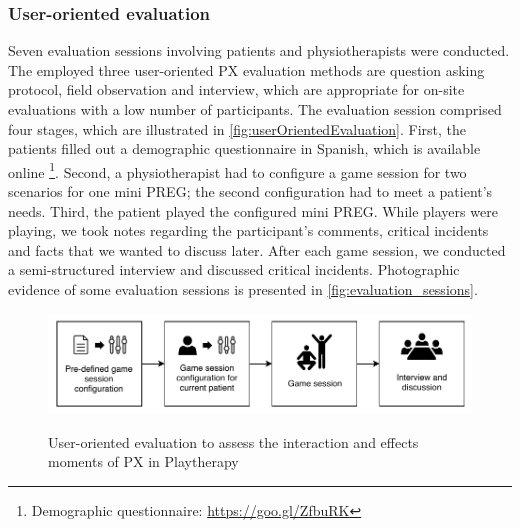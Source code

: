 \subsubsection{User-oriented evaluation}
Seven evaluation sessions involving patients and physiotherapists were conducted. The employed three user-oriented \ac{PX} evaluation methods are question asking protocol, field observation and interview, which are appropriate for on-site evaluations with a low number of participants. The evaluation session comprised four stages, which are illustrated in \autoref{fig:userOrientedEvaluation}. First, the patients filled out a demographic questionnaire in Spanish, which is available online \footnote{Demographic questionnaire: \url{https://goo.gl/ZfbuRK}}. Second, a physiotherapist had to configure a game session for two scenarios for one mini \ac{PREG}; the second configuration had to meet a patient's needs. Third, the patient played the configured mini \ac{PREG}. While players were playing, we took notes regarding the participant's comments, critical incidents and facts that we wanted to discuss later. After each game session, we conducted a semi-structured interview and discussed critical incidents. Photographic evidence of some evaluation sessions is presented in \autoref{fig:evaluation_sessions}.

\begin{figure}[bth]
\myfloatalign
{\includegraphics[width=.9\linewidth]{gfx/playtherapy/userOrientedEvaluation}} \quad
\caption{User-oriented evaluation to assess the interaction and effects moments of \ac{PX} in Playtherapy}
\label{fig:userOrientedEvaluation}
\end{figure}

